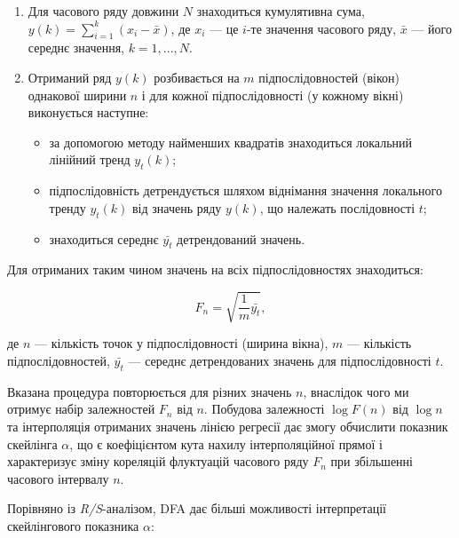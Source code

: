 \documentclass[
  letterpaper,
]{report}
\providecommand{\tightlist}{%
  \setlength{\itemsep}{0pt}\setlength{\parskip}{0pt}}\usepackage{longtable,booktabs,array}
\begin{document}
\begin{enumerate}
\def\labelenumi{\arabic{enumi}.}
\tightlist
\item
  Для часового ряду довжини \(N\) знаходиться кумулятивна сума,
  \(y(k)=\sum_{i=1}^{k}\left( x_i - \bar{x} \right)\), де \(x_i\) --- це
  \(i\)-те значення часового ряду, \(\bar{x}\) --- його середнє
  значення, \(k=1,...,N\).
\item
  Отриманий ряд \(y(k)\) розбивається на \(m\) підпослідовностей (вікон)
  однакової ширини \(n\) і для кожної підпослідовності (у кожному вікні)
  виконується наступне:

  \begin{itemize}
  \tightlist
  \item
    за допомогою методу найменших квадратів знаходиться локальний
    лінійний тренд \(y_{t}(k)\);\\
  \item
    підпослідовність детрендується шляхом віднімання значення локального
    тренду \(y_{t}(k)\) від значень ряду \(y(k)\), що належать
    послідовності \(t\);
  \item
    знаходиться середнє \(\bar{y_t}\) детрендований значень.
  \end{itemize}
\end{enumerate}

Для отриманих таким чином значень на всіх підпослідовностях знаходиться:

\[
F_n = \sqrt{\frac{1}{m}\bar{y_t}}, 
\]

де \(n\) --- кількість точок у підпослідовності (ширина вікна), \(m\)
--- кількість підпослідовностей, \(\bar{y_t}\) --- середнє детрендованих
значень для підпослідовності \(t\).

Вказана процедура повторюється для різних значень \(n\), внаслідок чого
ми отримує набір залежностей \(F_n\) від \(n\). Побудова залежності
\(\log{F(n)}\) від \(\log{n}\) та інтерполяція отриманих значень лінією
регресії дає змогу обчислити показник скейлінга \(\alpha\), що є
коефіцієнтом кута нахилу інтерполяційної прямої і характеризує зміну
кореляцій флуктуацій часового ряду \(F_n\) при збільшенні часового
інтервалу \(n\).

Порівняно із \emph{R/S}-аналізом, DFA дає більші можливості
інтерпретації скейлінгового показника \(\alpha\):
\end{document}
